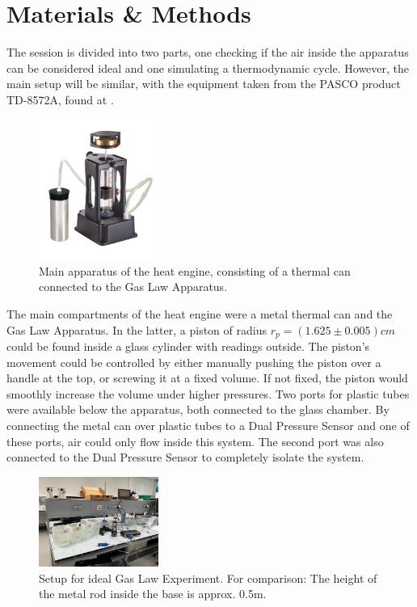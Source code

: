 \newpage
\section{Materials \& Methods}

The session is divided into two parts, one checking if the air inside the apparatus can be considered ideal and one simulating a thermodynamic cycle. However, the main setup will be similar, with the equipment taken from the PASCO product TD-8572A, found at \cite{PASCO2024CavMan}.

\begin{figure}  %
    \centering
    \includegraphics[width=0.35\textwidth]{Graphics/Apparatus.png}  %
    \caption{Main apparatus of the heat engine, consisting of a thermal can connected to the Gas Law Apparatus. \cite{PASCO2024CavMan}}
    \label{fig:Apparatus}
\end{figure}

The main compartments of the heat engine were a metal thermal can and the Gas Law Apparatus. In the latter, a piston of radius $\mathit{r_p = (1.625 \pm 0.005)cm}$ could be found inside a glass cylinder with readings outside. The piston's movement could be controlled by either manually pushing the piston over a handle at the top, or screwing it at a fixed volume. If not fixed, the piston would smoothly increase the volume under higher pressures. Two ports for plastic tubes were available below the apparatus, both connected to the glass chamber. By connecting the metal can over plastic tubes to a Dual Pressure Sensor and one of these ports, air could only flow inside this system. The second port was also connected to the Dual Pressure Sensor to completely isolate the system. 

\begin{figure}  %
    \centering
    \includegraphics[width=0.35\textwidth]{Graphics/Ideal_Gas_Setup.jpeg}  %
    \caption{Setup for ideal Gas Law Experiment. For comparison: The height of the metal rod inside the base is approx. 0.5m.}
    \label{fig:Ideal_Setup}
\end{figure}

